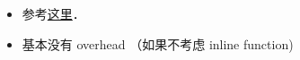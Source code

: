 
\begin{issues}
\issueDraft
\end{issues}

\begin{itemize}
\item 参考\href{https://docs.julialang.org/en/v1/manual/calling-c-and-fortran-code/}{这里}．
\item 基本没有 overhead （如果不考虑 inline function)
\end{itemize}
